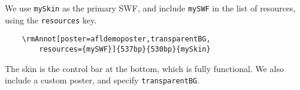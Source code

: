 \documentclass{article}
\begin{document}
\maketitle

\begin{center}
\end{center}

We use \texttt{mySkin} as the primary SWF, and include
\texttt{mySWF} in the list of resources, using the
\texttt{resources} key.
\begin{verbatim}
    \rmAnnot[poster=afldemoposter,transparentBG,
        resources={mySWF}]{537bp}{530bp}{mySkin}
\end{verbatim}
The skin is the control bar at the bottom, which is fully functional.
We also include a custom poster, and specify \texttt{transparentBG}.
\end{document}
